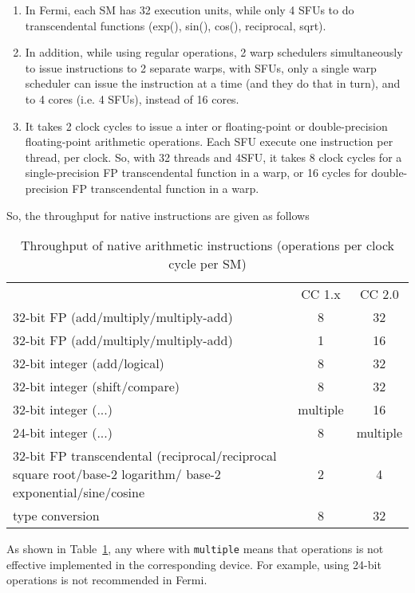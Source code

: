 \begin{enumerate}
\item In Fermi, each SM has 32 execution units, while only 4 SFUs to do
  transcendental functions (exp(), sin(), cos(), reciprocal, sqrt).

\item In addition, while using regular operations, 2 warp schedulers
  simultaneously to issue instructions to 2 separate warps, with SFUs,
  only a single warp scheduler can issue the instruction at a time
  (and they do that in turn), and to 4 cores (i.e. 4 SFUs), instead of
  16 cores.
\item It takes 2 clock cycles to issue a inter or floating-point or
  double-precision floating-point arithmetic operations. Each SFU
  execute one instruction per thread, per clock. So, with 32 threads
  and 4SFU, it takes 8 clock cycles for a single-precision FP
  transcendental function in a warp, or 16 cycles for double-precision
  FP transcendental function in a warp. 
\end{enumerate}

So, the throughput for native instructions are given as follows
\begin{table}[hbt]
  \centering
  \begin{tabular}{|p{5cm}|cc|}
    & CC 1.x & CC 2.0 \\
    32-bit FP (add/multiply/multiply-add) & 8 & 32\\
    32-bit FP (add/multiply/multiply-add) & 1 & 16 \\
    32-bit integer (add/logical) & 8 & 32 \\
    32-bit integer (shift/compare) & 8 & 32 \\
    32-bit integer (...) & multiple & 16  \\
    24-bit integer (...) & 8 & multiple \\
    32-bit FP transcendental (reciprocal/reciprocal square root/base-2
    logarithm/ base-2 exponential/sine/cosine & 2 & 4 \\
    type conversion & 8 & 32 \\
  \end{tabular}
  \caption{Throughput of native arithmetic instructions (operations per clock cycle per SM)}
  \label{tab:instr_throughput}
\end{table}

As shown in Table~\ref{tab:instr_throughput}, any where with
\verb!multiple! means that operations is not effective implemented in
the corresponding device. For example, using 24-bit operations is not
recommended in Fermi.


